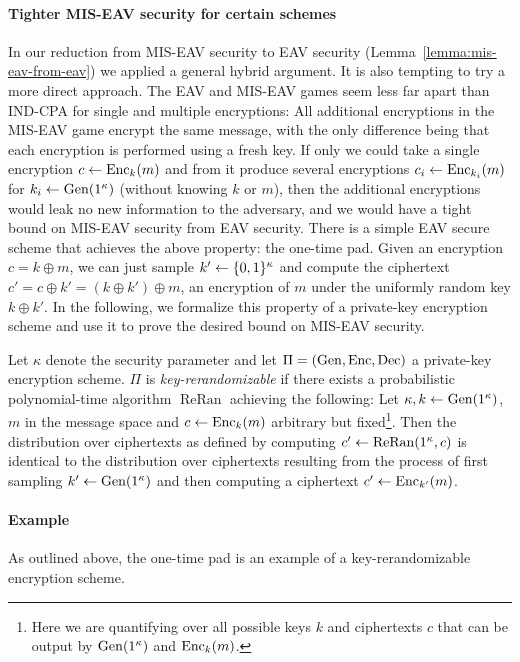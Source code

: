\paragraph{Tighter MIS-EAV security for certain schemes} \label{sec:tighter-mis-eav-security}

In our reduction from MIS-EAV security to EAV security (Lemma~\ref{lemma:mis-eav-from-eav}) we applied a general hybrid argument. It is also tempting to try a more direct approach. The EAV and MIS-EAV games seem less far apart than IND-CPA for single and multiple encryptions: All additional encryptions in the MIS-EAV game encrypt the same message, with the only difference being that each encryption is performed using a fresh key. If only we could take a single encryption $c \leftarrow \mathrm{Enc}_k(m)$ and from it produce several encryptions $c_i \leftarrow \mathrm{Enc}_{k_i}(m)$ for $k_i \leftarrow \mathrm{Gen}(1^\kappa)$ (without knowing $k$ or $m$), then the additional encryptions would leak no new information to the adversary, and we would have a tight bound on MIS-EAV security from EAV security. There is a simple EAV secure scheme that achieves the above property: the one-time pad. Given an encryption $c = k \oplus m$, we can just sample $k' \leftarrow \{0, 1\}^\kappa$ and compute the ciphertext $c' = c \oplus k' = (k \oplus k') \oplus m$, an encryption of $m$ under the uniformly random key $k \oplus k'$. In the following, we formalize this property of a private-key encryption scheme and use it to prove the desired bound on MIS-EAV security.

\begin{definition} \label{def:key-rerandomizability}
	Let $\kappa$ denote the security parameter and let $\Pi = (\mathrm{Gen}, \mathrm{Enc}, \mathrm{Dec})$ a private-key encryption scheme. $\Pi$ is \emph{key-rerandomizable} if there exists a probabilistic polynomial-time algorithm $\operatorname{ReRan}$ achieving the following: Let $\kappa, k \leftarrow \mathrm{Gen}(1^\kappa)$, $m$ in the message space and $c \leftarrow \mathrm{Enc}_k(m)$ arbitrary but fixed\footnote{Here we are quantifying over all possible keys $k$ and ciphertexts $c$ that can be output by $\mathrm{Gen}(1^\kappa)$ and $\mathrm{Enc}_k(m)$.}. Then the distribution over ciphertexts as defined by computing $c' \leftarrow \operatorname{ReRan}(1^\kappa, c)$ is identical to the distribution over ciphertexts resulting from the process of first sampling $k' \leftarrow \mathrm{Gen}(1^\kappa)$ and then computing a ciphertext $c' \leftarrow \mathrm{Enc}_{k'}(m)$.
\end{definition}

\paragraph{Example} As outlined above, the one-time pad is an example of a key-rerandomizable encryption scheme.

